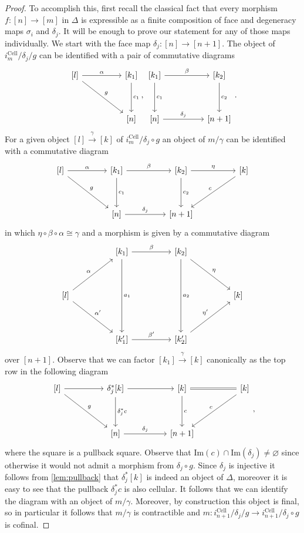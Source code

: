 \documentclass[a4paper, reqno]{amsart}
\theoremstyle{definition}
\newcommand\ima{\mathrm{Im}}
\begin{document}
\begin{proof}
To accomplish this, first recall the classical fact that every morphism $f:[n]\rightarrow [m]$ in $\Delta$ is expressible as a finite composition of face and degeneracy maps $\sigma_i$ and $\delta_j$. It will be enough to prove our statement for any of those maps individually. We start with the face map $\delta_j:[n]\rightarrow[n+1]$. The object of $i_m^\mathrm{Cell}/\delta_j/g$ can be identified with a pair of commutative diagrams
\[
\begin{tikzcd}[row sep=huge, column sep=huge]
{[l]}\arrow[dr, "g"]\arrow[r, "\alpha"]&{[k_1]\arrow[d, "c_1"]}\\
{}&{[n]}
\end{tikzcd},
\begin{tikzcd}[row sep=huge, column sep=huge]
{[k_1]}\arrow[r, "\beta"]\arrow[d, "c_1"]&{[k_2]}\arrow[d, "c_2"]\\
{[n]}\arrow[r, "\delta_j"]&{[n+1]}
\end{tikzcd}.
\]
For a given object $[l]\xrightarrow{\gamma}[k]$ of $i_m^\mathrm{Cell}/\delta_j\circ g$ an object of $m/\gamma$ can be identified with a commutative diagram
\[
\begin{tikzcd}[row sep=huge, column sep=huge]
{[l]}\arrow[dr, "g"]\arrow[r, "\alpha"]&{[k_1]}\arrow[d, "c_1"]\arrow[r, "\beta"]&{[k_2]}\arrow[d, "c_2"]\arrow[r, "\eta"]&{[k]}\arrow[dl, "c" swap]\\
{}&{[n]}\arrow[r, "\delta_j"]&{[n+1]}
\end{tikzcd}
\]
in which $\eta\circ \beta\circ \alpha\cong\gamma$ and a morphism is given by a commutative diagram 
\[
\begin{tikzcd}[row sep=huge, column sep=huge]
{}&{[k_1]}\arrow[r, "\beta"]\arrow[dd, "a_1"]&{[k_2]}\arrow[dd, "a_2"]\arrow[dr, "\eta"]\\
{[l]}\arrow[ur, "\alpha"]\arrow[dr, "\alpha'"]&{}&{}&{[k]}\\
{}&{[k_1']}\arrow[r, "\beta'"]&{[k_2']}\arrow[ur, "\eta'"]
\end{tikzcd}
\]
over $[n+1]$. Observe that we can factor $[k_1]\xrightarrow{\gamma}[k]$ canonically as the top row in the following diagram 
\[
\begin{tikzcd}[row sep=huge, column sep=huge]
{[l]}\arrow[r]\arrow[dr, "g"]&\delta_j^*{[k]}\arrow[d, "\delta_j^* c"]\arrow[r]&{[k]}\arrow[d,"c"]\arrow[r, equal]&{[k]}\arrow[dl, "c" swap]\\
{}&{[n]}\arrow[r, "\delta_j"]&{[n+1]}
\end{tikzcd},
\]
where the square is a pullback square. Observe that $\ima(c)\cap\ima(\delta_j)\neq\varnothing$ since otherwise it would not admit a morphism from $\delta_j\circ g$. Since $\delta_j$ is injective it follows from \cref{lem:pullback} that $\delta_j^*[k]$ is indeed an object of $\Delta$, moreover it is easy to see that the pullback $\delta_j^* c$ is also cellular. It follows that we can identify the diagram with an object of $m/\gamma$. Moreover, by construction this object is final, so in particular it follows that $m/\gamma$ is contractible and $m:i_{n+1}^\mathrm{Cell}/\delta_j/g\rightarrow i_{n+1}^\mathrm{Cell}/\delta_j\circ g$ is cofinal.\par

\end{proof}
\end{document}
